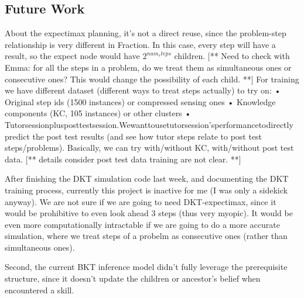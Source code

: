 \subsection{Future Work}
About the expectimax planning, it’s not a direct reuse, since the problem-step relationship is very different in Fraction. In this case, every step will have a result, so the expect node would have $2^{num_steps}$ children. [** Need to check with Emma: for all the steps in a problem, do we treat them as simultaneous ones or consecutive ones? This would change the possibility of each child. **]
For training we have different dataset (different ways to treat steps actually) to try on:
• Original step ids (1500 instances) or compressed sensing ones
• Knowledge components (KC, 105 instances) or other clusters
• Tutorsessionplusposttestsession.Wewanttousetutorsession’sperformancetodirectly predict the post test results (and see how tutor steps relate to post test steps/problems).
Basically, we can try with/without KC, with/without post test data. [** details consider post test data training are not clear. **]


After finishing the DKT simulation code last week, and documenting the DKT training process, currently this project is inactive for me (I was only a sidekick anyway). We are not sure if we are going to need DKT-expectimax, since it would be prohibitive to even look ahead 3 steps (thus very myopic). It would be even more computationally intractable if we are going to do a more accurate simulation, where we treat steps of a probelm as consecutive ones (rather than simultaneous ones).

Second, the current BKT inference model didn't fully leverage the prerequisite structure, since it doesn't update the children or ancestor's belief when encountered a skill.
